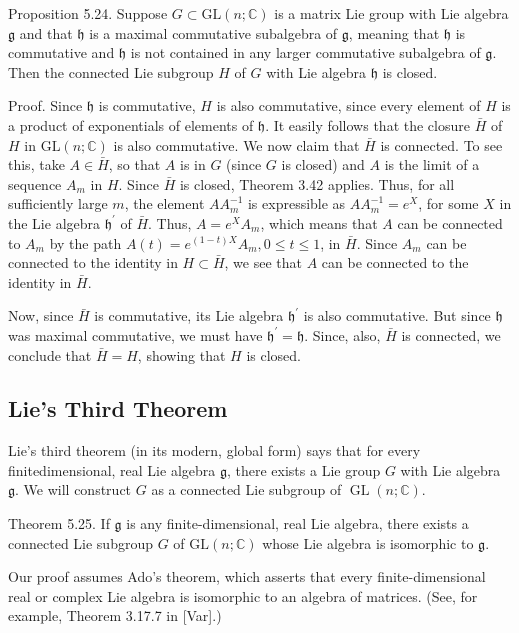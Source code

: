 \documentclass[10pt, letterpaper]{article}
\begin{document}
Proposition 5.24. Suppose $G \subset \mathrm{GL}(n ; \mathbb{C})$ is a matrix Lie group with Lie algebra $\mathfrak{g}$ and that $\mathfrak{h}$ is a maximal commutative subalgebra of $\mathfrak{g}$, meaning that $\mathfrak{h}$ is commutative and $\mathfrak{h}$ is not contained in any larger commutative subalgebra of $\mathfrak{g}$. Then the connected Lie subgroup $H$ of $G$ with Lie algebra $\mathfrak{h}$ is closed.

Proof. Since $\mathfrak{h}$ is commutative, $H$ is also commutative, since every element of $H$ is a product of exponentials of elements of $\mathfrak{h}$. It easily follows that the closure $\bar{H}$ of $H$ in $\mathrm{GL}(n ; \mathbb{C})$ is also commutative. We now claim that $\bar{H}$ is connected. To see this, take $A \in \bar{H}$, so that $A$ is in $G$ (since $G$ is closed) and $A$ is the limit of a sequence $A_{m}$ in $H$. Since $\bar{H}$ is closed, Theorem 3.42 applies. Thus, for all sufficiently large $m$, the element $A A_{m}^{-1}$ is expressible as $A A_{m}^{-1}=e^{X}$, for some $X$ in the Lie algebra $\mathfrak{h}^{\prime}$ of $\bar{H}$. Thus, $A=e^{X} A_{m}$, which means that $A$ can be connected to $A_{m}$ by the path $A(t)=e^{(1-t) X} A_{m}, 0 \leq t \leq 1$, in $\bar{H}$. Since $A_{m}$ can be connected to the identity in $H \subset \bar{H}$, we see that $A$ can be connected to the identity in $\bar{H}$.

Now, since $\bar{H}$ is commutative, its Lie algebra $\mathfrak{h}^{\prime}$ is also commutative. But since $\mathfrak{h}$ was maximal commutative, we must have $\mathfrak{h}^{\prime}=\mathfrak{h}$. Since, also, $\bar{H}$ is connected, we conclude that $\bar{H}=H$, showing that $H$ is closed.

\subsection*{Lie's Third Theorem}
Lie's third theorem (in its modern, global form) says that for every finitedimensional, real Lie algebra $\mathfrak{g}$, there exists a Lie group $G$ with Lie algebra $\mathfrak{g}$. We will construct $G$ as a connected Lie subgroup of $\operatorname{GL}(n ; \mathbb{C})$.

Theorem 5.25. If $\mathfrak{g}$ is any finite-dimensional, real Lie algebra, there exists a connected Lie subgroup $G$ of $\mathrm{GL}(n ; \mathbb{C})$ whose Lie algebra is isomorphic to $\mathfrak{g}$.

Our proof assumes Ado's theorem, which asserts that every finite-dimensional real or complex Lie algebra is isomorphic to an algebra of matrices. (See, for example, Theorem 3.17.7 in [Var].)
\end{document}
